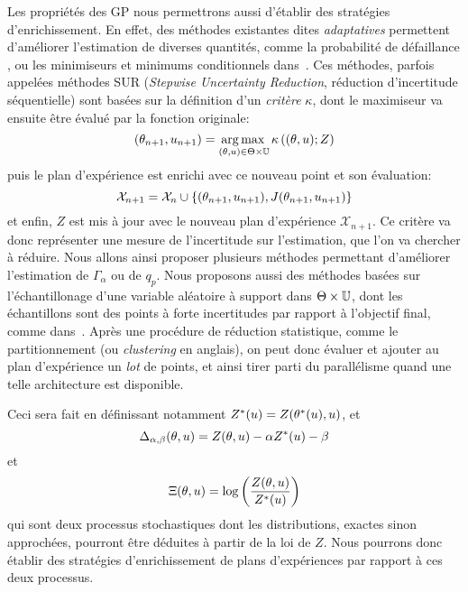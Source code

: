 \documentclass[../../Main_ManuscritThese.tex]{subfiles}
\begin{document}
Les propriétés des GP nous permettrons aussi d'établir des stratégies
d'enrichissement. En effet, des méthodes existantes dites
\emph{adaptatives} permettent d'améliorer l'estimation de diverses
quantités, comme la probabilité de défaillance
\cite{razaaly_rare_2019,moustapha_quantile-based_2016,bect_sequential_2012},
ou les minimiseurs et minimums conditionnels
dans~\cite{ginsbourger_bayesian_2014}. Ces méthodes, parfois appelées
méthodes SUR (\emph{Stepwise Uncertainty Reduction}, réduction
d'incertitude séquentielle) sont basées sur la définition d'un
\emph{critère} $\kappa$, dont le maximiseur va ensuite être évalué par la fonction
originale: 
\begin{equation*}
  (\theta_{n+1}, u_{n+1}) = \operatorname*{arg\,max \,}_{(\theta,u) \in \Theta\times\mathbb{U}} \kappa\left((\theta, u); Z\right)
\end{equation*}
puis le plan d'expérience est enrichi avec ce nouveau point et son évaluation:
\begin{equation*}
\mathcal{X}_{n+1} = \mathcal{X}_n \cup \{(\theta_{n+1}, u_{n+1}), J(\theta_{n+1}, u_{n+1})\}
\end{equation*}
et enfin, $Z$ est mis à jour avec le nouveau plan d'expérience
$\mathcal{X}_{n+1}$.  Ce critère va donc représenter une mesure de
l'incertitude sur l'estimation, que l'on va chercher à réduire. Nous
allons ainsi proposer plusieurs méthodes permettant d'améliorer
l'estimation de $\Gamma_{\alpha}$ ou de $q_p$.  Nous proposons aussi
des méthodes basées sur l'échantillonage d'une variable aléatoire à
support dans $\Theta\times \mathbb{U}$, dont les échantillons sont des
points à forte incertitudes par rapport à l'objectif final, comme
dans~\cite{echard_ak-mcs_2011,razaaly_rare_2019}. Après une procédure
de réduction statistique, comme le partitionnement (ou
\emph{clustering} en anglais), on peut donc évaluer et ajouter au plan
d'expérience un \emph{lot} de points, et ainsi tirer parti du
parallélisme quand une telle architecture est disponible.

Ceci sera fait en définissant notamment
$Z^*(u) = Z(\theta^*(u),u)$, et
\begin{equation*}
  \Delta_{\alpha,\beta}(\theta, u) = Z(\theta, u) - \alpha Z^*(u) - \beta
\end{equation*}
et
\begin{equation*}
  \Xi(\theta, u) = \log\left(\frac{Z(\theta, u)}{Z^*(u)}\right)
\end{equation*}
qui sont deux processus stochastiques dont les distributions, exactes
sinon approchées, pourront être déduites à partir de la loi de $Z$.
Nous pourrons donc établir des stratégies d'enrichissement de plans
d'expériences par rapport à ces deux processus.
\end{document}
